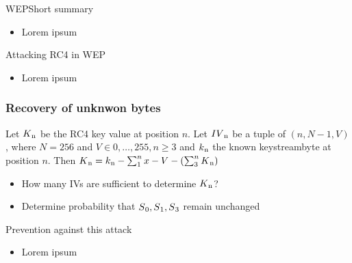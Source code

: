 \documentclass[
	aspectratio=169,	%
	onlytextwidth,		%
	t,					%
	]{beamer}
\begin{document}
\begin{frame}[fragile]{WEP}{Short summary}
	\begin{itemize}
		\item Lorem ipsum
	\end{itemize}
\end{frame}

\begin{frame}[fragile]{Attacking RC4 in WEP}
	\begin{itemize}
		\item Lorem ipsum
	\end{itemize}
\end{frame}

\begin{frame} 
	\frametitle{Recovery of unknwon bytes} 
	\begin{theorem}
		Let $ K\textsubscript{n} $ be the RC4 key value at position $ n $. Let $ IV\textsubscript{n} $ be a tuple of $ (n, N-1, V) $,
		where $ N = 256 $ and  $ V \in {{0,\dots,255}}, n \geq 3 $ and $ k\textsubscript{n} $ the known keystreambyte at position $n$.
		Then $ K\textsubscript{n} = k\textsubscript{n} - \sum_{1}^{n}x - V - (\sum_{3}^{n}K\textsubscript{n}) $ 
	\end{theorem} 
	\begin{itemize}
		\item How many IVs are sufficient to determine $ K\textsubscript{n} $?
		\item Determine probability that $ S\textsubscript{0}, S\textsubscript{1}, S\textsubscript{3} $ remain unchanged
	\end{itemize}
\end{frame}

\begin{frame}[fragile]{Prevention against this attack}
	\begin{itemize}
		\item Lorem ipsum
	\end{itemize}
\end{frame}

\appendix
\makethankyou

\section{\appendixname}
\end{document}
